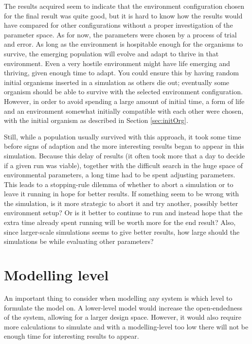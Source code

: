 
The results acquired seem to indicate that the environment configuration chosen for the final result was quite good, but it is hard to know how the results would have compared for other configurations without a proper investigation of the parameter space. As for now, the parameters were chosen by a process of trial and error. As long as the environment is hospitable enough for the organisms to survive, the emerging population will evolve and adapt to thrive in that environment. Even a very hostile environment might have life emerging and thriving, given enough time to adapt. You could ensure this by having random initial organisms inserted in a simulation as others die out; eventually some organism should be able to survive with the selected environment configuration. However, in order to avoid spending a large amount of initial time, a form of life and an environment somewhat initially compatible with each other were chosen, with the initial organism as described in Section \ref{sec:initOrg}.


Still, while a population usually survived with this approach, it took some time before signs of adaption and the more interesting results began to appear in this simulation. Because this delay of results (it often took more that a day to decide if a given run was viable), together with the difficult search in the huge space of environmental parameters, a long time had to be spent adjusting parameters. This leads to a stopping-rule dilemma of whether to abort a simulation or to leave it running in hope for better results. If something seem to be wrong with the simulation, is it more strategic to abort it and try another, possibly better environment setup? Or is it better to continue to run and instead hope that the extra time already spent running will be worth more for the end result? Also, since larger-scale simulations seems to give better results, how large should the simulations be while evaluating other parameters?

\section{Modelling level}
An important thing to consider when modelling any system is which level to formulate the model on. A lower-level model would increase the open-endedness of the system, allowing for a larger design space. However, it would also require more calculations to simulate and with a modelling-level too low there will not be enough time for interesting results to appear.


